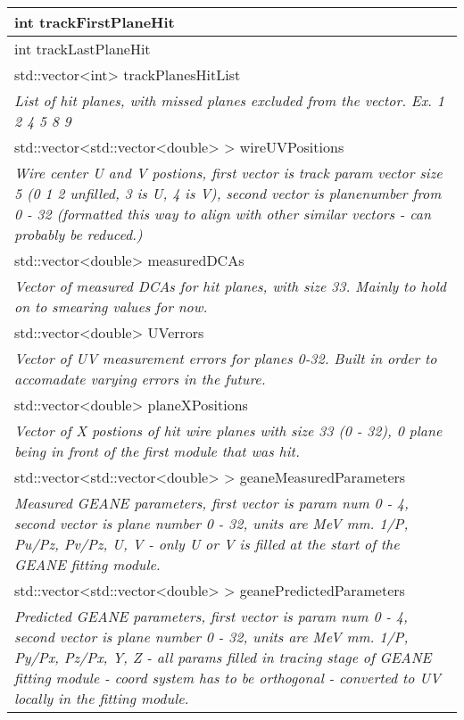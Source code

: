 \begin{longtable}{|p{16cm}|}
int trackFirstPlaneHit \\ \hline

int trackLastPlaneHit \\ \hline

std::vector\textless{}int\textgreater{} trackPlanesHitList \\
\textit{List of hit planes, with missed planes excluded from the vector. Ex. 1 2 4 5 8 9} \\ \hline


std::vector\textless{}std::vector\textless{}double\textgreater{} \textgreater{} wireUVPositions \\
\textit{Wire center U and V postions, first vector is track param vector size 5 (0 1 2 unfilled, 3 is U, 4 is V), second vector is planenumber from 0 - 32  (formatted this way to align with other similar vectors - can probably be reduced.)} \\ \hline

std::vector\textless{}double\textgreater{} measuredDCAs \\
\textit{Vector of measured DCAs for hit planes, with size 33. Mainly to hold on to smearing values for now.} \\ \hline

std::vector\textless{}double\textgreater{} UVerrors \\
\textit{Vector of UV measurement errors for planes 0-32. Built in order to accomadate varying errors in the future.} \\ \hline

std::vector\textless{}double\textgreater{} planeXPositions \\
\textit{Vector of X postions of hit wire planes with size 33 (0 - 32), 0 plane being in front of the first module that was hit.} \\ \hline

std::vector\textless{}std::vector\textless{}double\textgreater{} \textgreater{} geaneMeasuredParameters \\
\textit{Measured GEANE parameters, first vector is param num 0 - 4, second vector is plane number 0 - 32, units are MeV mm. 1/P, Pu/Pz, Pv/Pz, U, V - only U or V is filled at the start of the GEANE fitting module.} \\ \hline

std::vector\textless{}std::vector\textless{}double\textgreater{} \textgreater{} geanePredictedParameters \\ 
\textit{Predicted GEANE parameters, first vector is param num 0 - 4, second vector is plane number 0 - 32, units are MeV mm. 1/P, Py/Px, Pz/Px, Y, Z - all params filled in tracing stage of GEANE fitting module - coord system has to be orthogonal - converted to UV locally in the fitting module.} \\ \hline


\end{longtable}
